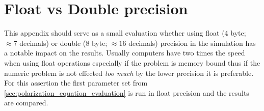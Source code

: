\documentclass[master.tex]{subfiles}
\begin{document}
\chapter{Float vs Double precision} \label{sec:float-vs-double}
\renewcommand{\thechapter}{A}
This appendix should serve as a small evaluation whether using float (4 byte; $\approx 7$ decimals) or double (8 byte; $\approx 16$ decimals) precision in the simulation has a notable impact on the results. Usually computers have two times the speed when using float operations especially if the problem is memory bound thus if the numeric problem is not effected \textit{too much} by the lower precision it is preferable.\newline
For this assertion the first parameter set from \autoref{sec:polarization_equation_evaluation} is run in float precision and the results are compared.
\end{document}
